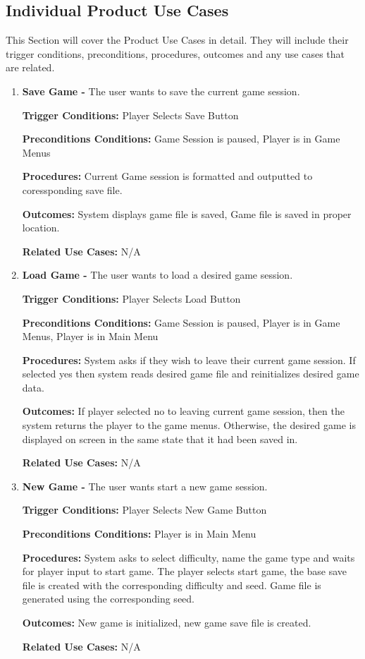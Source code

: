 \documentclass{article}
\begin{document}
\subsection{Individual Product Use Cases}
\quad This Section will cover the Product Use Cases in detail. They will include their trigger conditions, preconditions, procedures, outcomes and any use cases that are related.
\begin{enumerate}[{PUC}1. ]
	\item \textbf{Save Game -} The user wants to save the current game session.\par
\textbf{Trigger Conditions: }Player Selects Save Button \par
\textbf{Preconditions Conditions: }Game Session is paused, Player is in Game Menus \par
\textbf{Procedures: }Current Game session is formatted and outputted to coressponding save file. \par
\textbf{Outcomes: }System displays game file is saved, Game file is saved in proper location.  \par
\textbf{Related Use Cases: }N/A \par

	\item \textbf{Load Game -} The user wants to load a desired game session.\par
\textbf{Trigger Conditions: }Player Selects Load Button \par
\textbf{Preconditions Conditions: }Game Session is paused, Player is in Game Menus, Player is in Main Menu \par
\textbf{Procedures: }System asks if they wish to leave their current game session. If selected yes then system reads desired game file and reinitializes desired game data.\par
\textbf{Outcomes: }If player selected no to leaving current game session, then the system returns the player to the game menus. Otherwise, the desired game is displayed on screen in the same state that it had been saved in. \par
\textbf{Related Use Cases: }N/A  \par

	\item \textbf{New Game -} The user wants start a new game session.\par
\textbf{Trigger Conditions: }Player Selects New Game Button \par
\textbf{Preconditions Conditions: }Player is in Main Menu \par
\textbf{Procedures: }System asks to select difficulty, name the game type and waits for player input to start game. The player selects start game, the base save file is created with the corresponding difficulty and seed. Game file is generated using the corresponding seed. \par
\textbf{Outcomes: }New game is initialized, new game save file is created. \par
\textbf{Related Use Cases: }N/A \par


\end{enumerate}
\end{document}
